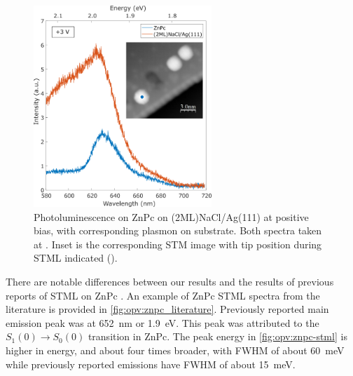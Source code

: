 


                    

\begin{figure} [H]
    \centering
    
        \includegraphics[width=0.6\textwidth]{pictures/znpc_+ve_emission_inset.png}
    
    \caption{Photoluminescence on ZnPc on (2ML)NaCl/Ag(111) at positive bias, with corresponding plasmon on substrate. Both spectra taken at . Inset is the corresponding STM image with tip position during STML indicated (). }
    \label{fig:opv:znpc-stml}
\end{figure}

There are notable differences between our results and the results of previous reports of \ac{STML} on ZnPc \citep{Zhang2016, Doppagne2017, Zhang2017, Doppagne2018}. An example of ZnPc \ac{STML} spectra from the literature is provided in \autoref{fig:opv:znpc_literature}. Previously reported main emission peak was at \SI{652}{nm} or \SI{1.9}{eV}. This peak was attributed to the $S_1(0) \rightarrow S_0(0)$ transition in ZnPc. The peak energy in \autoref{fig:opv:znpc-stml} is higher in energy, and about four times broader, with \ac{FWHM} of about \SI{60}{meV} while previously reported emissions have \ac{FWHM} of about \SI{15}{meV}.

